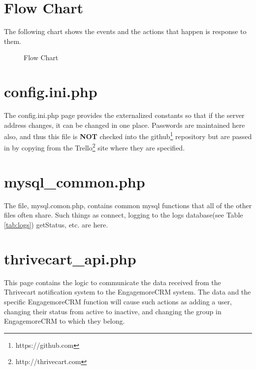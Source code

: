 \documentclass[final,letterpaper,12pt]{article}
\begin{document}
\section{Flow Chart}
\noindent The following chart shows the events and the actions that happen is response to them.
\smallskip
\begin{figure}[ht]
\begin{center}
\caption{\label{fig:flowchart}Flow Chart}
\end{center}
\end{figure}
\newpage
\begin{appendices}

\section{config.ini.php}
\noindent The config.ini.php page provides the externalized constants so that if the server address changes, it can be changed in one place.  Passwords are maintained here also, and thus this file is {\bf NOT} checked into the github\footnote{https://github.com} repository but are passed in by copying from the Trello\footnote{http://thrivecart.com} site where they are specified.



\section{mysql\_common.php}
\noindent The file, mysql.comon.php, contains common mysql functions that all of the other files often share.  Such things as connect, logging to the logs database(see Table \ref{tab:logs}) getStatus, etc. are here.



\section{thrivecart\_api.php}
\noindent This page contains the logic to communicate the data received from the Thrivecart notification system to the EngagemoreCRM system.  The data and the specific EngagemoreCRM function will cause such actions as adding a user, changing their status from active to inactive, and changing the group in EngagemoreCRM to which they belong.


\end{appendices}
\end{document}
